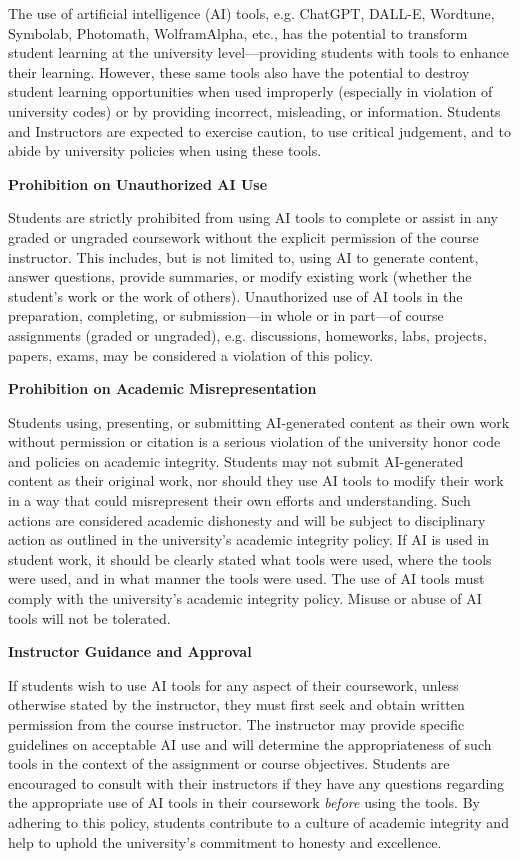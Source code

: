 \documentclass[11pt,letterpaper]{article}
\begin{document}
The use of artificial intelligence (AI) tools, e.g. ChatGPT, DALL-E, Wordtune, Symbolab, Photomath, WolframAlpha, etc., has the potential to transform student learning at the university level---providing students with tools to enhance their learning. However, these same tools also have the potential to destroy student learning opportunities when used improperly (especially in violation of university codes) or by providing incorrect, misleading, or information. Students and Instructors are expected to exercise caution, to use critical judgement, and to abide by university policies when using these tools. \pspace

{\bfseries Prohibition on Unauthorized AI Use} \par
Students are strictly prohibited from using AI tools to complete or assist in any graded or ungraded coursework without the explicit permission of the course instructor. This includes, but is not limited to, using AI to generate content, answer questions, provide summaries, or modify existing work (whether the student's work or the work of others). Unauthorized use of AI tools in the preparation, completing, or submission---in whole or in part---of course assignments (graded or ungraded), e.g. discussions, homeworks, labs, projects, papers, exams, may be considered a violation of this policy. \pspace

{\bfseries Prohibition on Academic Misrepresentation} \par
Students using, presenting, or submitting AI-generated content as their own work without permission or citation is a serious violation of the university honor code and policies on academic integrity. Students may not submit AI-generated content as their original work, nor should they use AI tools to modify their work in a way that could misrepresent their own efforts and understanding. Such actions are considered academic dishonesty and will be subject to disciplinary action as outlined in the university's academic integrity policy. If AI is used in student work, it should be clearly stated what tools were used, where the tools were used, and in what manner the tools were used. The use of AI tools must comply with the university's academic integrity policy. Misuse or abuse of AI tools will not be tolerated. \pspace

{\bfseries Instructor Guidance and Approval} \par
If students wish to use AI tools for any aspect of their coursework, unless otherwise stated by the instructor, they must first seek and obtain written permission from the course instructor. The instructor may provide specific guidelines on acceptable AI use and will determine the appropriateness of such tools in the context of the assignment or course objectives. Students are encouraged to consult with their instructors if they have any questions regarding the appropriate use of AI tools in their coursework \textit{before} using the tools. By adhering to this policy, students contribute to a culture of academic integrity and help to uphold the university's commitment to honesty and excellence. \pspace
\end{document}
